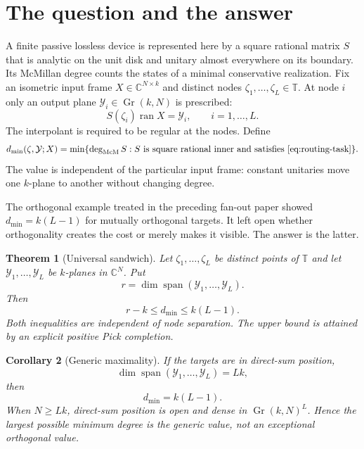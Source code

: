\documentclass[11pt]{article}
\newtheorem{theorem}{Theorem}[section]
\newtheorem{corollary}[theorem]{Corollary}
\theoremstyle{definition}
\theoremstyle{remark}
\newcommand{\C}{\mathbb C}
\newcommand{\T}{\mathbb T}
\newcommand{\ran}{\operatorname{ran}}
\newcommand{\Span}{\operatorname{span}}
\newcommand{\mcdeg}{\deg_{\mathrm{McM}}}
\begin{document}
\section{The question and the answer}

A finite passive lossless device is represented here by a square rational
matrix $S$ that is analytic on the unit disk and unitary almost everywhere
on its boundary.  Its McMillan degree counts the states of a minimal
conservative realization.  Fix an isometric input frame
$X\in\C^{N\times k}$ and distinct nodes
$\zeta_1,\ldots,\zeta_L\in\T$.  At node $i$ only an output plane
$\mathcal Y_i\in\operatorname{Gr}(k,N)$ is prescribed:
\begin{equation}\label{eq:routing-task}
                 S(\zeta_i)\ran X=\mathcal Y_i,
                 \qquad i=1,\ldots,L.
\end{equation}
The interpolant is required to be regular at the nodes.  Define
\begin{equation}\label{eq:dmin}
d_{\min}(\zeta,\mathcal Y;X)
=\min\{\mcdeg S:S\text{ is square rational inner and satisfies
\eqref{eq:routing-task}}\}.
\end{equation}
The value is independent of the particular input frame: constant unitaries
move one $k$-plane to another without changing degree.

The orthogonal example treated in the preceding fan-out paper
\cite{ErikssonGlobalFanout2026} showed
$d_{\min}=k(L-1)$ for mutually orthogonal targets.  It left open whether
orthogonality creates the cost or merely makes it visible.  The answer is
the latter.

\begin{theorem}[Universal sandwich]\label{thm:sandwich}
Let $\zeta_1,\ldots,\zeta_L$ be distinct points of $\T$ and let
$\mathcal Y_1,\ldots,\mathcal Y_L$ be $k$-planes in $\C^N$.  Put
\[
                     r=\dim\Span(\mathcal Y_1,\ldots,\mathcal Y_L).
\]
Then
\begin{equation}\label{eq:sandwich}
                       r-k\le d_{\min}\le k(L-1).
\end{equation}
Both inequalities are independent of node separation.  The upper bound is
attained by an explicit positive Pick completion.
\end{theorem}

\begin{corollary}[Generic maximality]\label{cor:generic}
If the targets are in direct-sum position,
\[
                \dim\Span(\mathcal Y_1,\ldots,\mathcal Y_L)=Lk,
\]
then
\begin{equation}\label{eq:exact-law}
                            d_{\min}=k(L-1).
\end{equation}
When $N\ge Lk$, direct-sum position is open and dense in
$\operatorname{Gr}(k,N)^L$.  Hence the largest possible minimum degree is
the generic value, not an exceptional orthogonal value.
\end{corollary}
\end{document}
